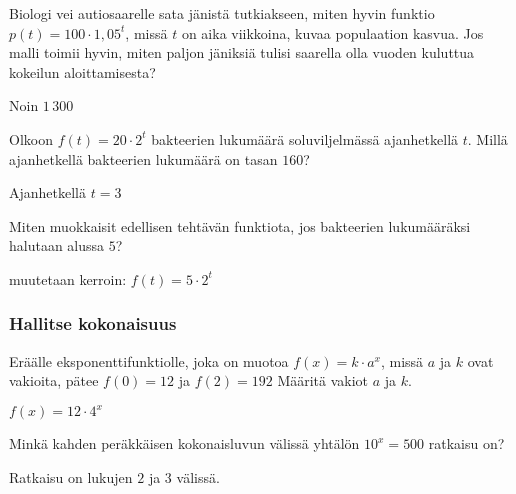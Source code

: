 \begin{tehtavasivu}
\begin{tehtava}
Biologi vei autiosaarelle sata jänistä tutkiakseen, miten hyvin funktio $ p(t)=100 \cdot 1,05^{t}$, missä $t$ on aika viikkoina, kuvaa populaation kasvua. Jos malli toimii hyvin, miten paljon jäniksiä tulisi saarella olla vuoden kuluttua kokeilun aloittamisesta?
\begin{vastaus}
Noin $1\,300$
\end{vastaus}
\end{tehtava}

\begin{tehtava}
Olkoon $f(t) = 20 \cdot 2^t$ bakteerien lukumäärä soluviljelmässä ajanhetkellä $t$. Millä ajanhetkellä bakteerien lukumäärä on tasan $160$?
\begin{vastaus}
Ajanhetkellä $t=3$ %
\end{vastaus}
\end{tehtava}

\begin{tehtava}
Miten muokkaisit edellisen tehtävän funktiota, jos bakteerien lukumääräksi halutaan alussa $5$?
\begin{vastaus}
muutetaan kerroin: $f(t) = 5 \cdot 2^t$
\end{vastaus}
\end{tehtava}

\subsubsection*{Hallitse kokonaisuus}

\begin{tehtava}
Eräälle eksponenttifunktiolle, joka on muotoa $ f(x)=k\cdot a^{x}  $, missä $ a $ ja $ k $ ovat vakioita, pätee $ f(0)=12 $ ja $ f(2)=192 $ Määritä vakiot $a$ ja $k$.
\begin{vastaus}
$f(x)=12\cdot 4^{x}$
\end{vastaus}
\end{tehtava}

\begin{tehtava}
Minkä kahden peräkkäisen kokonaisluvun välissä yhtälön $10^x = 500$ ratkaisu on?
\begin{vastaus}
Ratkaisu on lukujen $2$ ja $3$ välissä.
\end{vastaus}
\end{tehtava}


\end{tehtavasivu}
